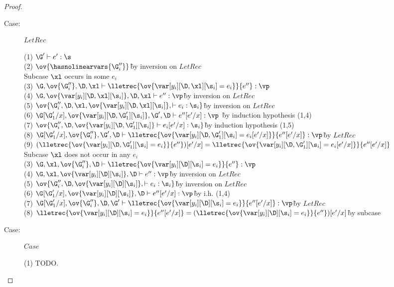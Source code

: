 \begin{proof}
\begin{description}
\item[Case:] $LetRec$
\begin{tabbing}
  (1) $\G' \vdash e' : \s$\\
  (2) $\ov{\hasnolinearvars{\G''_i}}$\` by inversion on $LetRec$\\
  Subcase $\xl$ occurs in some $e_i$\\
  (3) $\G, \ov{\G''_i}, \D, \xl \vdash \lletrec{\ov{\var[y_i][\D,\xl][\s_i] = e_i}}{e''} : \vp$\\
  (4) $\G, \ov{\var[y_i][\D,\xl][\s_i]}, \D, \xl \vdash e'' : \vp$\` by inversion on $LetRec$\\
  (5) $\ov{\G''_i, \D, \xl, \ov{\var[y_i][\D, \xl][\s_i]}, \vdash e_i : \s_i}$\` by inversion on $LetRec$\\
  (6) $\G[\G'_1/x], \ov{\var[y_i][\D, \G'_1][\s_i]}, \G', \D \vdash e''[e'/x] : \vp$ \` by induction hypothesis (1,4)\\
  (7) $\ov{\G''_i, \D, \ov{\var[y_i][\D, \G'_1][\s_i]} \vdash e_i[e'/x] : \s_i}$\` by induction hypothesis (1,5)\\
  (8) $\G[\G'_1/x], \ov{\G''_i}, \G', \D \vdash \lletrec{\ov{\var[y_i][\D,\G'_1][\s_i] = e_i[e'/x]}}{e''[e'/x]} : \vp$\` by $LetRec$\\
  (9) $(\lletrec{\ov{\var[y_i][\D,\G'_1][\s_i] = e_i}}{e''})[e'/x] = \lletrec{\ov{\var[y_i][\D,\G'_1][\s_i] = e_i[e'/x]}}{e''[e'/x]}$\\
  Subcase $\xl$ does not occur in any $e_i$\\
  (3) $\G, \xl, \ov{\G''_i}, \D \vdash \lletrec{\ov{\var[y_i][\D][\s_i] = e_i}}{e''} : \vp$\\
  (4) $\G, \xl, \ov{\var[y_i][\D][\s_i]}, \D \vdash e'' : \vp$\` by inversion on $LetRec$\\
  (5) $\ov{\G''_i, \D, \ov{\var[y_i][\D][\s_i]}, \vdash e_i : \s_i}$\` by inversion on $LetRec$\\
  (6) $\G[\G'_1/x], \ov{\var[y_i][\D][\s_i]}, \D \vdash e''[e'/x] : \vp$\` by i.h. (1,4)\\
  (7) $\G[\G'_1/x], \ov{\G''_i}, \D, \G' \vdash \lletrec{\ov{\var[y_i][\D][\s_i] = e_i}}{e''[e'/x]} : \vp$\` by $LetRec$\\
  (8) $\lletrec{\ov{\var[y_i][\D][\s_i] = e_i}}{e''[e'/x]} =
  (\lletrec{\ov{\var[y_i][\D][\s_i] = e_i}}{e''})[e'/x]$\` by subcase\\
\end{tabbing}

\item[Case:] $Case$
\begin{tabbing}
  (1) TODO.\\
\end{tabbing}

\end{description}

\end{proof}

